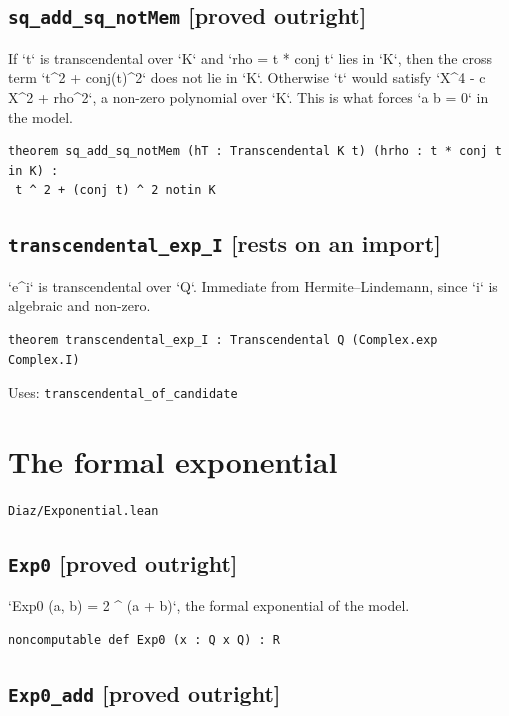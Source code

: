 \documentclass[11pt,a4paper]{article}
\newcommand{\tagon}{\textcolor{onaxc}{\textbf{[rests on an import]}}}
\newcommand{\tagpr}{\textcolor{provedc}{\textbf{[proved outright]}}}
\begin{document}
\subsection*{\texttt{sq\_add\_sq\_notMem} \hfill \tagpr}

If `t` is transcendental over `K` and `rho = t * conj t` lies in `K`, then the cross term `t\^{}2 + conj(t)\^{}2` does not lie in `K`. Otherwise `t` would satisfy `X\^{}4 - c X\^{}2 + rho\^{}2`, a non-zero polynomial over `K`. This is what forces `a b = 0` in the model.

\begin{lstlisting}
theorem sq_add_sq_notMem (hT : Transcendental K t) (hrho : t * conj t in K) :
 t ^ 2 + (conj t) ^ 2 notin K
\end{lstlisting}

\subsection*{\texttt{transcendental\_exp\_I} \hfill \tagon}

`e\^{}i` is transcendental over `Q`. Immediate from Hermite--Lindemann, since `i` is algebraic and non-zero.

\begin{lstlisting}
theorem transcendental_exp_I : Transcendental Q (Complex.exp Complex.I)
\end{lstlisting}
\noindent\footnotesize Uses: \texttt{transcendental\_of\_candidate}\normalsize


\section{The formal exponential}
\noindent\texttt{Diaz/Exponential.lean}


\subsection*{\texttt{Exp0} \hfill \tagpr}

`Exp0 (a, b) = 2 \^{} (a + b)`, the formal exponential of the model.

\begin{lstlisting}
noncomputable def Exp0 (x : Q x Q) : R
\end{lstlisting}

\subsection*{\texttt{Exp0\_add} \hfill \tagpr}
\end{document}
